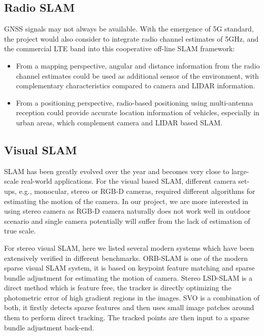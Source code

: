 
\subsection{Radio SLAM}

\gls{GNSS} signals may not always be available. With the emergence of 5G
standard, the project would also consider to integrate radio channel
estimates of 5GHz, and the commercial LTE
band into this cooperative off-line \gls{SLAM} framework:
\begin{itemize}
\item   From a mapping perspective, angular and distance information
  from the radio channel estimates could be used as additional sensor
  of the environment, with complementary characteristics compared to
  camera and LIDAR information.
\item From a positioning perspective, radio-based positioning using
multi-antenna reception could provide accurate location information of
vehicles, especially in urban areas, which complement camera and LIDAR
based SLAM.
\end{itemize}


\subsection{Visual SLAM}

\gls{SLAM} has been greatly evolved over the year and becomes very
close to large-scale real-world applications. For the visual based
\gls{SLAM}, different camera set-ups, e.g., monocular, stereo or RGB-D
cameras, required different algorithms for estimating the motion of
the camera. In our project, we are more interested in using stereo
camera as RGB-D camera naturally does not work well in outdoor scenario
and single camera potentially will suffer from the lack of estimation
of true scale.


For stereo visual \gls{SLAM}, here we listed several modern systems
which have been extensively verified in different
benchmarks. ORB-SLAM\cite{DBLP:journals/corr/Mur-ArtalT16a} is one of the modern sparse visual \gls{SLAM}
system, it is based on keypoint feature matching and sparse bundle
adjustment for estimating the motion of camera. Stereo LSD-SLAM\cite{7353631} is
a direct method which is feature free, the tracker is directly
optimizing the photometric error of  high gradient regions in the
images. SVO\cite{7782863} is a combination of both, it firstly detects sparse
features and then uses small image patches around them to perform
direct tracking. The tracked points are then input to a sparse bundle
adjustment back-end.

